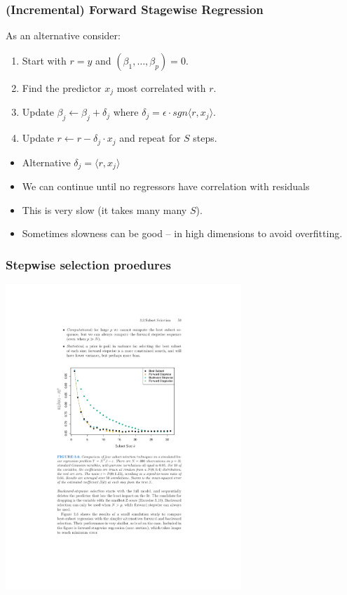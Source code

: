 \documentclass[xcolor=pdftex,dvipsnames,table,mathserif]{beamer}
\begin{document}
\begin{frame}
\frametitle{(Incremental) Forward Stagewise Regression}
As an alternative consider:
\begin{enumerate}
\item Start with $r= y$ and $(\beta_1, \ldots, \beta_p) = 0$.
\item Find the predictor $x_j$ most correlated with $r$.
\item Update $\beta_j \leftarrow \beta_j + \delta_j$ where $\delta_j = \epsilon \cdot sgn \langle r , x_j \rangle$.
\item Update $r \leftarrow r - \delta_j \cdot x_j$ and repeat for $S$ steps.
\end{enumerate}
\begin{itemize}
\item Alternative $\delta_j =  \langle r , x_j \rangle$
\item We can continue until no regressors have correlation with residuals 
\item This is very slow (it takes many many $S$).
\item Sometimes slowness can be good -- in high dimensions to avoid overfitting.
\end{itemize}
\end{frame}



\begin{frame}
\frametitle{Stepwise selection proedures}
\begin{center}
\includegraphics[width=3.5in]{./resources/subsetstepwise}
\end{center}
\end{frame}
\end{document}
